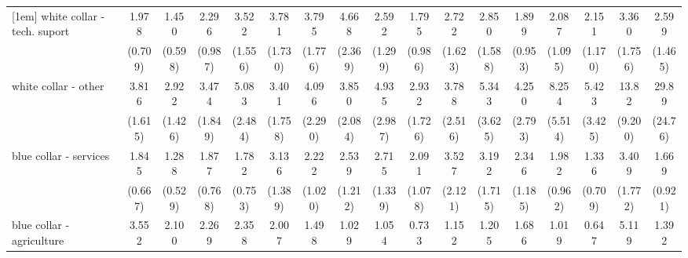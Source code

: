 {\begin{tabular}{l*{16}{c}}
[1em]
white collar - tech. suport&       1.978         &       1.450         &       2.296         &       3.522\sym{**} &       3.781\sym{**} &       3.795\sym{**} &       4.668\sym{**} &       2.592         &       1.795         &       2.722         &       2.850         &       1.899         &       2.087         &       2.151         &       3.360\sym{*}  &       2.599         \\
                    &     (0.709)         &     (0.598)         &     (0.987)         &     (1.556)         &     (1.730)         &     (1.776)         &     (2.369)         &     (1.299)         &     (0.986)         &     (1.623)         &     (1.588)         &     (0.953)         &     (1.095)         &     (1.170)         &     (1.756)         &     (1.465)         \\
[1em]
white collar - other&       3.816\sym{**} &       2.922\sym{*}  &       3.474\sym{*}  &       5.083\sym{***}&       3.401\sym{*}  &       4.096\sym{*}  &       3.850\sym{*}  &       4.935\sym{**} &       2.932         &       3.788\sym{*}  &       5.343\sym{*}  &       4.250\sym{*}  &       8.254\sym{**} &       5.423\sym{**} &       13.82\sym{***}&       29.89\sym{***}\\
                    &     (1.615)         &     (1.426)         &     (1.849)         &     (2.484)         &     (1.758)         &     (2.290)         &     (2.084)         &     (2.987)         &     (1.726)         &     (2.516)         &     (3.625)         &     (2.793)         &     (5.514)         &     (3.425)         &     (9.200)         &     (24.76)         \\
[1em]
blue collar - services&       1.845         &       1.288         &       1.877         &       1.782         &       3.136\sym{**} &       2.222         &       2.539         &       2.715\sym{*}  &       2.091         &       3.527\sym{*}  &       3.192\sym{*}  &       2.346         &       1.982         &       1.336         &       3.409\sym{*}  &       1.669         \\
                    &     (0.667)         &     (0.529)         &     (0.768)         &     (0.753)         &     (1.389)         &     (1.020)         &     (1.212)         &     (1.339)         &     (1.078)         &     (2.121)         &     (1.715)         &     (1.185)         &     (0.962)         &     (0.709)         &     (1.772)         &     (0.921)         \\
[1em]
blue collar - agriculture&       3.552\sym{*}  &       2.100         &       2.269         &       2.358         &       2.007         &       1.498         &       1.029         &       1.054         &       0.733         &       1.152         &       1.205         &       1.686         &       1.019         &       0.647         &       5.119\sym{*}  &       1.392         \\

\end{tabular}}
